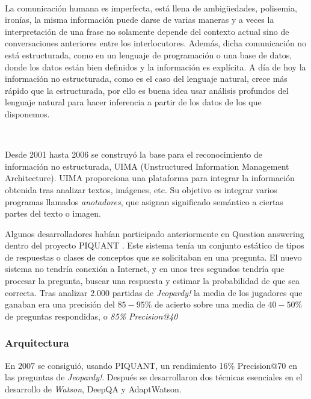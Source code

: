 \documentclass[paper=a4, fontsize=10pt]{scrartcl} %
\numberwithin{equation}{section} %
\numberwithin{figure}{section} %
\numberwithin{table}{section} %
\begin{document}
\

La comunicación humana es imperfecta, está llena de ambigüedades, polisemia, ironías, la misma información puede darse de varias maneras y a veces la interpretación de una frase no solamente depende del contexto actual sino de conversaciones anteriores entre los interlocutores.
Además, dicha comunicación no está estructurada, como en un lenguaje de programación o una base de datos, donde los datos están bien definidos y la información es explícita.
A día de hoy la información no estructurada, como es el caso del lenguaje natural, crece más rápido que la estructurada, por ello es buena idea usar análisis profundos del lenguaje natural para hacer inferencia a partir de los datos de los que disponemos.

\

Desde 2001 hasta 2006 se construyó la base para el reconocimiento de información no estructurada, UIMA (Unstructured
Information Management Architecture). %
UIMA proporciona una plataforma para integrar la información obtenida tras analizar textos, imágenes, etc.
Su objetivo es integrar varios programas llamados \textit{anotadores}, que asignan significado semántico a ciertas partes del texto o imagen.


Algunos desarrolladores habían participado anteriormente en Question answering dentro del proyecto PIQUANT \cite{piquant}. %
Este sistema tenía un conjunto estático de tipos de respuestas o clases de conceptos que se solicitaban en una pregunta.
El nuevo sistema no tendría conexión a Internet, y en unos tres segundos tendría que procesar la pregunta, buscar una respuesta y estimar la probabilidad de que sea correcta.
Tras analizar $2.000$ partidas de \textit{Jeopardy!} la media de los jugadores que ganaban era una precisión del $85-95\%$ de acierto sobre una media de $40-50\%$ de preguntas respondidas, o 
\textit{85\% Precision@40}


\subsubsection{Arquitectura}
En $2007$ se consiguió, usando PIQUANT, un rendimiento 16\% Precision@70 en las preguntas de \textit{Jeopardy!}.
Después se desarrollaron dos técnicas esenciales en el desarrollo de \textit{Watson}, DeepQA %
y AdaptWatson. %
\end{document}
